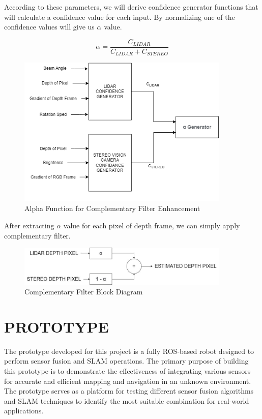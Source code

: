 \documentclass[12pt]{article}
\begin{document}
According to these parameters, we will derive confidence generator functions that will calculate a confidence value for each input. By normalizing one of the confidence values will give us $\alpha$ value.

\begin{equation}
    \alpha = \frac{C_{LIDAR}}{C_{LIDAR} + C_{STEREO}}
\end{equation}

\begin{figure}[H]
    \centering
    \includegraphics[width=0.9\textwidth]{AlphaFunction.jpeg}
    \caption{Alpha Function for Complementary Filter Enhancement}
\end{figure}

After extracting $\alpha$ value for each pixel of depth frame, we can simply apply complementary filter.

\begin{figure}[H]
    \centering
    \includegraphics[width=0.9\textwidth]{CompFiltBD.jpeg}
    \caption{Complementary Filter Block Diagram}
\end{figure}


\section{PROTOTYPE}

The prototype developed for this project is a fully ROS-based robot designed to perform sensor fusion and SLAM operations. The primary purpose of building this prototype is to demonstrate the effectiveness of integrating various sensors for accurate and efficient mapping and navigation in an unknown environment. The prototype serves as a platform for testing different sensor fusion algorithms and SLAM techniques to identify the most suitable combination for real-world applications.
\end{document}
